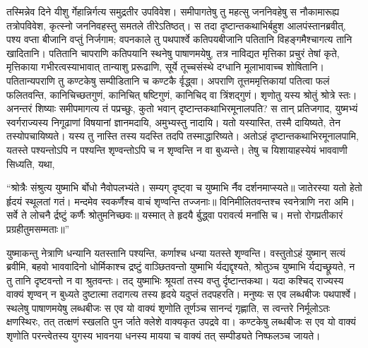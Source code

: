 \adhyAya
{}
\vakya तस्मिन्नेव दिने यीशु र्गेहान्निर्गत्य समुद्रतीर उपविवेश।
\vakya समीपागतेषु तु महत्सु जननिवहेषु स नौकामारूह्य तत्रोपविवेश, कृत्स्नो जननिवहस्तु समतले तीरेऽतिष्ठत्।
\vakya स तदा दृष्टान्तकथाभिर्बहुश आलपंस्तानब्रवीत्,
\vakya पश्य वप्ता बीजानि वप्तुं निर्जगाम; वपनकाले तु पथपार्श्वे कतिपयबीजानि पतितानि विहङ्गमैश्चागत्य तानि खादितानि।
\vakya पतितानि चापराणि कतिपयानि स्थनेषु पाषाणमयेषु, तत्र नाविद्यत मृत्तिका प्रचुरं तेषां कृते, मृत्तिकाया गभीरत्वस्याभावात् तान्याशु प्ररूढाणि,
\vakya सूर्ये तूच्चसंस्थे दग्धानि मूलाभावाच्च शोषितानि।
\vakya पतितान्यपराणि तु कण्टकेषु सम्पीडितानि च कण्टकै र्वृद्ध्वा।
\vakya अपराणि तूत्तममृत्तिकायां पतित्वा फलं फलितवन्ति, कानिचिच्छतगुणं, कानिचित् षष्टिगुणं, कानिचिद् वा त्रिंशद्गुणं।
\vakya शृणोतु यस्य श्रोतुं श्रोत्रे स्तः।
\vakya अनन्तरं शिष्याः समीपमागत्य तं पप्रच्छुः, कुतो भवान् दृष्टान्तकथाभिरमूनालपति?
\vakya स तान् प्रतिजगाद, युष्मभ्यं स्वर्गराज्यस्य निगूढाणां विषयानां ज्ञानमदायि, अमुभ्यस्तु नादायि।
\vakya यतो यस्यास्ति, तस्मै दायिष्यते, तेन तस्योपचायिष्यते। यस्य तु नास्ति तस्य यदस्ति तदपि तस्माद्धारिष्यते।
\vakya अतोऽहं दृष्टान्तकथाभिरमूनालपामि, यतस्ते पश्यन्तोऽपि न पश्यन्ति शृण्वन्तोऽपि च न शृण्वन्ति न वा बुध्यन्ते।
\vakya तेषु च यिशायाहस्येयं भाववाणी सिध्यति, यथा,
\begin{poem}
\startwithline “श्रोत्रैः संश्रुत्य युष्माभि र्बोधो नैवोपलभ्यंते।
\pline सम्यग् दृष्ट्वा च युष्माभि र्नैव दर्शनमाप्स्यते॥
\vakya जातेरस्या यतो हेतो र्हृदयं स्थूलतां गतं।
\pline मन्दमेव स्वकर्णैश्च वाचं शृण्वन्ति तज्जनाः॥
\pline विनिमीलितवन्तश्च स्वनेत्राणि नरा अमि।
\pline सर्वे ते लोचनै र्द्रष्टुं कर्णैः श्रोतुमनिच्छवः॥
\pline यस्मात् ते हृदयै र्बुद्ध्वा परावर्त्य मनांसि च।
\pline मत्तो रोगप्रतीकारं प्रग्रहीतुमसम्मताः॥”
\end{poem}
\vakya युष्माकन्तु नेत्राणि धन्यानि यतस्तानि पश्यन्ति, कर्णाश्च धन्या यतस्ते शृण्वन्ति।
\vakya वस्तुतोऽहं युष्मान् सत्यं ब्रवीमि, बहवो भाववादिनो धोर्मिकाश्च द्रष्टुं वाञ्छितवन्तो युष्माभि र्यद्यद्दृश्यते, श्रोतुञ्च युष्माभि र्यद्यच्छ्रूयते, न तु तानि दृष्टवन्तो न वा श्रुतवन्तः।
\vakya तद् युष्माभिः श्रूयतां तस्य वप्तु र्दृष्टान्तकथा।
\vakya यदा कश्चिद् राज्यस्य वाक्यं शृण्वन् न बुध्यते दुष्टात्मा तदागत्य तस्य हृदये यदुप्तं तदपहरति। मनुष्यः स एव लब्धबीजः पथपार्श्वे।
\vakya स्थलेषु पाषाणमयेषु लब्धबीजः स एव यो वाक्यं शृणोति तूर्णञ्च सानन्दं गृह्णाति,
\vakya स त्वन्तरे निर्मूलोऽतः क्षणस्थिरः, तत् तत्क्षणं स्खलति पुन र्जाते क्लेशे वाक्यकृत उपद्रवे वा।
\vakya कण्टकेषु लब्धबीजः स एव यो वाक्यं शृणोति परन्त्वेतस्य युगस्य भावनया धनस्य मायया च वाक्यं तत् सम्पीड्यते निष्फलञ्च जायते।
